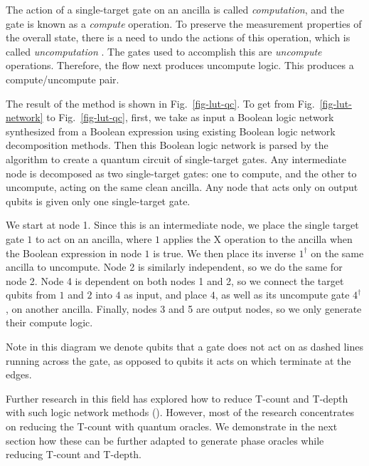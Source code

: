 The action of a single-target gate on an ancilla is called {\it computation}, and the gate is
known as a {\it compute} operation. To preserve the measurement properties of the overall state,
there is a need to undo the actions of this operation, which is called {\it uncomputation}
\cite{bib-barenco-elementary}. The gates used to accomplish this are {\it uncompute} operations.
Therefore, the flow next produces uncompute logic. This produces a compute/uncompute pair.

The result of the method is shown in Fig.~\ref{fig-lut-qc}. To get from
Fig.~\ref{fig-lut-network} to Fig.~\ref{fig-lut-qc}, first, we take as input a Boolean
logic network synthesized from a Boolean expression using existing Boolean logic network
decomposition methods. Then this Boolean logic network is parsed by the algorithm to
create a quantum circuit of single-target gates. Any intermediate node is decomposed as two
single-target gates: one to compute, and the other to uncompute, acting on the same clean
ancilla. Any node that acts only on output qubits is given only one single-target gate.


\begin{example}
  \label{ex-lut}
  We start at node 1. Since this is an intermediate node, we place the single target gate
  $1$ to act on an ancilla, where $1$ applies the X operation to the ancilla when the Boolean expression
  in node $1$ is true. We then place its inverse $1^{\dagger}$ on the same ancilla to
  uncompute. Node 2 is similarly independent, so we do the same for node 2. Node 4 is
  dependent on both nodes 1 and 2, so we connect the target qubits from $1$ and $2$
  into $4$ as input, and place $4$, as well as its uncompute gate $4^{\dagger}$, on
  another ancilla. Finally, nodes 3 and 5 are output nodes, so we only generate their
  compute logic.

  Note in this diagram we denote qubits that a gate does not act on as dashed lines running
  across the gate, as opposed to qubits it acts on which terminate at the edges.
\end{example}

Further research in this field has explored how to reduce T-count and T-depth with such logic network
methods (\cite{bib-meuli-ros,bib-accel-lut}). However, most of the research concentrates
on reducing the T-count with quantum oracles. We demonstrate in the next section how these can be
further adapted to generate phase oracles while reducing T-count and T-depth.


